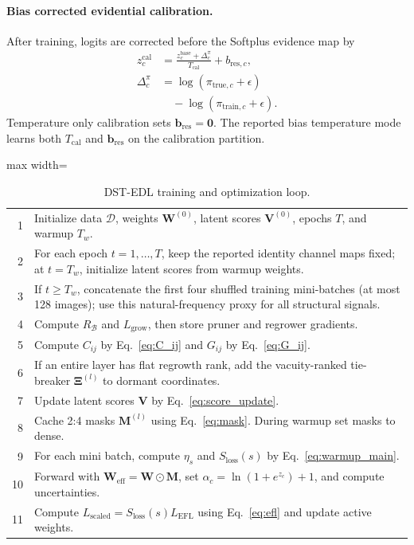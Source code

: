 \documentclass[letterpaper]{article}
\begin{document}
\paragraph{Bias corrected evidential calibration.}
After training, logits are corrected before the Softplus evidence map by
\begin{equation}
\begin{aligned}
    z^{\mathrm{cal}}_c&=
    \frac{z^{\mathrm{base}}_c+\Delta^\pi_c}{T_{\mathrm{cal}}}
    +b_{\mathrm{res},c},\\
    \Delta^\pi_c&=\log(\pi_{\mathrm{true},c}+\epsilon)\\
    &\quad-\log(\pi_{\mathrm{train},c}+\epsilon).
\end{aligned}
\end{equation}
Temperature only calibration sets $\bm{b}_{\mathrm{res}}=\bm{0}$. The reported bias temperature mode learns both $T_{\mathrm{cal}}$ and $\bm{b}_{\mathrm{res}}$ on the calibration partition.

\begin{table}[tbp]
\centering
\caption{DST-EDL training and optimization loop.}
\label{alg:dst_edl}
\scriptsize
\renewcommand{\arraystretch}{1.04}
\begin{adjustbox}{max width=\columnwidth}
\begin{tabular}{@{}r p{}@{}}
\toprule
1 & Initialize data $\mathcal{D}$, weights $\bm{W}^{(0)}$, latent scores $\bm{V}^{(0)}$, epochs $T$, and warmup $T_w$. \\
2 & For each epoch $t=1,\ldots,T$, keep the reported identity channel maps fixed; at $t=T_w$, initialize latent scores from warmup weights. \\
3 & If $t\ge T_w$, concatenate the first four shuffled training mini-batches (at most 128 images); use this natural-frequency proxy for all structural signals. \\
4 & Compute $R_{\mathcal B}$ and $L_{\text{grow}}$, then store pruner and regrower gradients. \\
5 & Compute $C_{ij}$ by Eq.~\ref{eq:C_ij} and $G_{ij}$ by Eq.~\ref{eq:G_ij}. \\
6 & If an entire layer has flat regrowth rank, add the vacuity-ranked tie-breaker $\bm\Xi^{(l)}$ to dormant coordinates. \\
7 & Update latent scores $\bm{V}$ by Eq.~\ref{eq:score_update}. \\
8 & Cache 2:4 masks $\bm{M}^{(l)}$ using Eq.~\ref{eq:mask}. During warmup set masks to dense. \\
9 & For each mini batch, compute $\eta_s$ and $S_{\text{loss}}(s)$ by Eq.~\ref{eq:warmup_main}. \\
10 & Forward with $\bm{W}_{\text{eff}}=\bm{W}\odot\bm{M}$, set $\alpha_c=\ln(1+e^{z_c})+1$, and compute uncertainties. \\
11 & Compute $L_{\text{scaled}}=S_{\text{loss}}(s)L_{\text{EFL}}$ using Eq.~\ref{eq:efl} and update active weights. \\
\bottomrule
\end{tabular}
\end{adjustbox}
\end{table}
\end{document}
